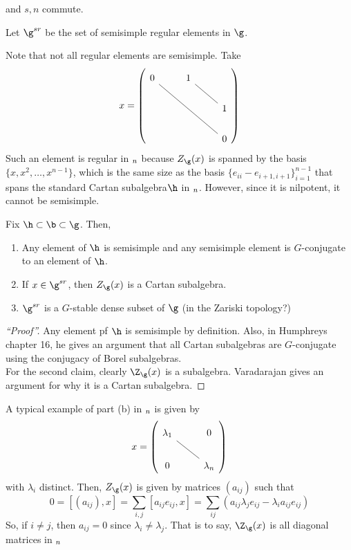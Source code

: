  and \(s,n\) commute.
 \begin{defn}
   Let \(\g^{sr}\) be the set of semisimple regular elements in
   \(\g\). 
 \end{defn}
 \begin{example}
   Note that not all regular elements are semisimple. Take \[
     x = \left(
       \begin{tikzcd}
         0 \ar[rrdd, dash]& 1 \ar[rd, dash] & \\
         & & 1 \\
         & & 0
       \end{tikzcd}
     \right)
   \]
   Such an element is regular in \(\sl_n\) because \(Z_\g(x)\) is
   spanned by the basis \(\{x, x^2, \ldots, x^{n-1}\}\), which is the
   same size as the basis \(\{e_{ii} - e_{i+1,i+1}\}_{i=1}^{n-1}\)
   that spans the standard Cartan subalgebra\(\h\) in
   \(\sl_n\). However, since it is nilpotent, it cannot be semisimple.
 \end{example}
 \begin{prop}
   Fix \(\h \subset \b \subset \g\). Then,
   \begin{enumerate}
   \item Any element of \(\h\) is semisimple and any semisimple
     element is \(G\)-conjugate to an element of \(\h\).
   \item If \(x \in \g^{sr}\), then \(Z_\g(x)\) is a Cartan
     subalgebra.
   \item \(\g^{sr}\) is a \(G\)-stable dense subset of \(\g\) (in the
     Zariski topology?)
   \end{enumerate}
 \end{prop}
 \begin{proof}[``Proof'']
   Any element pf \(\h\) is semisimple by definition. Also, in
   Humphreys chapter 16, he gives an argument that all Cartan subalgebras
   are \(G\)-conjugate using the conjugacy of Borel subalgebras. \\

   For the second claim, clearly \(\Z_\g(x)\) is a
   subalgebra. Varadarajan gives an argument for why it is a Cartan
   subalgebra. 
 \end{proof}
 \begin{example}
   A typical example of part (b) in \(\sl_n\) is given by \[
     x = \left(
       \begin{tikzcd}
         \lambda_1 \ar[rd, dash]& 0 \\
         0 & \lambda_n
       \end{tikzcd}
     \right)
   \]
   with \(\lambda_i\) distinct. Then, \(Z_\g(x)\) is given by matrices
   \((a_{ij})\) such that \[
     0 = [(a_{ij}), x] = \sum_{i,j} [a_{ij} e_{ij}, x] = \sum_{ij}
     (a_{ij} \lambda_j e_{ij} - \lambda_i a_{ij} e_{ij})
   \]
   So, if \(i \neq j\), then \(a_{ij} = 0\) since \(\lambda_i \neq
   \lambda_j\). That is to say, \(\Z_\g(x)\) is all diagonal matrices
   in \(\sl_n\)
 \end{example}

